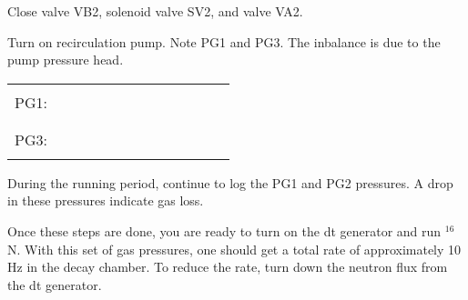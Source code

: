 \begin{enumerate}
\checkitem Close valve VB2, solenoid valve SV2, and valve VA2.
 
\checkitem Turn on recirculation pump.  Note PG1 and PG3.  
  The inbalance is due to the pump pressure head.
     \begin{center}
     \begin{tabular}{|l|}
     \hline
      \\
     PG1:~~~~~~~~~~~~~~~~~~~~~~~~\\
      \\
     \hline
      \\
     PG3:~~~~~~~~~~~~~~~~~~~~~~~~\\
      \\
     \hline
     \end{tabular}
     \end{center}

\checkitem  During the running period, continue to log the
  PG1 and PG2 pressures.  A drop in these pressures indicate
  gas loss.

\end{enumerate}

Once these steps are done, you are ready to turn on the dt generator
and run $^{16}$N.  With this set of gas pressures, one should get a total
rate of approximately 10 Hz in the decay chamber.  To reduce the rate,
turn down the neutron flux from the dt generator.





\newpage
